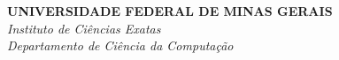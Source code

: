 \documentclass[
	12pt,				%
	oneside, %
	a4paper,			%
	english,			%
	french,				%
	spanish,			%
	brazil				%
	]{abntex2}
\begin{document}

\frenchspacing

\pretextual

\begin{center}
\large
\textbf{UNIVERSIDADE FEDERAL DE MINAS GERAIS} \\
\textit{Instituto de Ciências Exatas\\
Departamento de Ciência da Computação\\}
\end{center}
\vspace{2.5cm}

\imprimircapa


\end{document}

